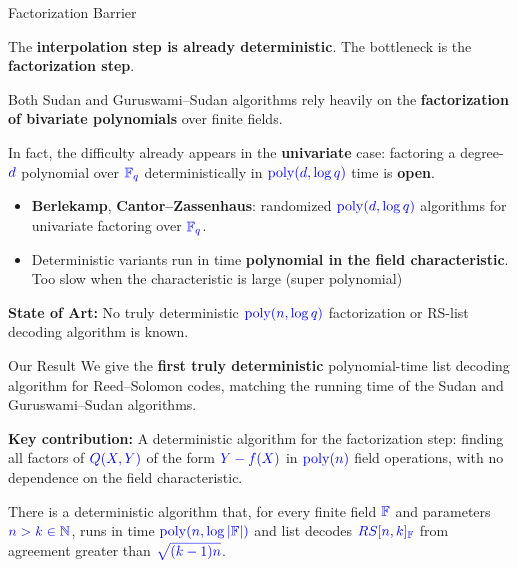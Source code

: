 \documentclass[10pt,handout]{beamer}
\DeclareMathOperator{\poly}{poly}
\begin{document}
\begin{frame}{Factorization Barrier}
	
	
	The \textbf{interpolation step is already deterministic}. The bottleneck is the \textbf{factorization step}.\pause
	
	Both Sudan and Guruswami–Sudan algorithms rely heavily on the \textbf{factorization of bivariate polynomials} over finite fields.
	\vspace{0.4em}

	In fact, the difficulty already appears in the \textbf{univariate} case: factoring a degree-$\textcolor{blue}{\textcolor{blue}{d}}$ polynomial over $\textcolor{blue}{\textcolor{blue}{\mathbb{F}_q}}$ deterministically in $\textcolor{blue}{\textcolor{blue}{\poly(d, \log q)}}$ time is \textbf{open}.\pause

	\begin{itemize}
		\item \textbf{Berlekamp}, \textbf{Cantor--Zassenhaus}: randomized $\textcolor{blue}{\textcolor{blue}{\poly(d,\log q)}}$ algorithms for univariate factoring over $\textcolor{blue}{\textcolor{blue}{\mathbb{F}_q}}$.\pause
		\item Deterministic variants run in time \textbf{polynomial in the field characteristic}. Too slow when the characteristic is large (super polynomial)
	\end{itemize}\pause

	\vspace{0.3em}
	\textbf{State of Art:} No truly deterministic $\textcolor{blue}{\textcolor{blue}{\poly(n,\log q)}}$ factorization or RS-list decoding algorithm is known.
\end{frame}

\begin{frame}{Our Result}
	We give the \textbf{first truly deterministic} polynomial-time list decoding algorithm for Reed--Solomon codes, matching the running time of the Sudan and Guruswami--Sudan algorithms.\pause

	\vspace{0.5em}

	\textbf{Key contribution:} A deterministic algorithm for the factorization step: finding all factors of $\textcolor{blue}{\textcolor{blue}{Q(X,Y)}}$ of the form $\textcolor{blue}{\textcolor{blue}{Y-f(X)}}$ in $\textcolor{blue}{\textcolor{blue}{\poly(n)}}$ field operations, with no dependence on the field characteristic.\pause
	\vfill

	\begin{theorem}
		There is a deterministic algorithm that, for every finite field $\textcolor{blue}{\mathbb{F}}$ and parameters $\textcolor{blue}{n > k \in \mathbb{N}}$, runs in time $\textcolor{blue}{\poly(n, \log |\bbF|)}$ and list decodes $\textcolor{blue}{RS[n,k]_{\mathbb{F}}}$ from agreement greater than $\textcolor{blue}{\sqrt{(k-1)n}}$.
	\end{theorem}

	\vspace{0.4em}
\end{frame}
\end{document}
